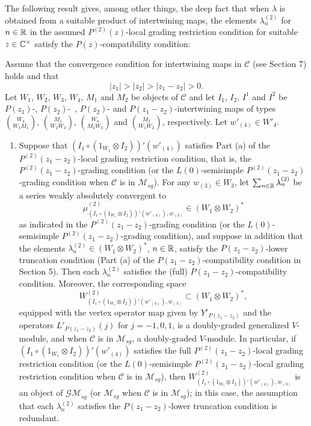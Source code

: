 \documentclass[12pt]{article}
\begin{document}
The following result gives, among other things, the deep fact that
when $\lambda$ is obtained from a suitable product of intertwining
maps, the elements $\lambda^{(2)}_{n}$ for $n\in \mathbb{R}$ in the assumed
$P^{(2)}(z)$-local grading restriction condition for suitable $z\in
\mathbb{C}^{\times}$ satisfy the $P(z)$-compatibility condition:

\setcounter{section}{9}
\setcounter{rema}{16}
\begin{theo}
Assume that the convergence condition for intertwining maps in
$\mathcal{C}$ (see Section 7) holds and that
\[
|z_1|>|z_2|>|z_{1}-z_{2}|>0.
\]
Let $W_{1}$, $W_{2}$, $W_{3}$, $W_{4}$, $M_{1}$ and $M_{2}$ be objects
of $\mathcal{C}$ and let $I_{1}$, $I_{2}$, $I^1$ and $I^2$ be
$P(z_1)$-, $P(z_2)$-~, $P(z_2)$- and $P(z_{1}-z_{2})$-intertwining
maps of types ${W_4}\choose {W_1M_1}$, ${M_1}\choose {W_2W_3}$,
${W_4}\choose {M_2W_3}$ and ${M_2}\choose {W_1W_2}$, respectively.
Let $w'_{(4)}\in W'_4$.
\begin{enumerate}

\item
Suppose that $(I_1\circ (1_{W_1}\otimes I_2))'(w'_{(4)})$ satisfies
Part (a) of the $P^{(2)}(z_{1}-z_{2})$-local grading restriction condition,
that is, the $P^{(2)}(z_{1}-z_{2})$-grading condition (or the
$L(0)$-semisimple $P^{(2)}(z_{1}-z_{2})$-grading condition when $\mathcal{C}$
is in $\mathcal{M}_{sg}$).  For any $w_{(3)}\in W_{3}$, let
$\sum_{n\in \mathbb{R}}\lambda_{n}^{(2)}$ be a series weakly absolutely
convergent to
\[
\mu^{(2)}_{(I_1\circ (1_{W_1}\otimes I_2))'(w'_{(4)}), w_{(3)}} \in
(W_1 \otimes W_2)^*
\]
as indicated in the $P^{(2)}(z_{1}-z_{2})$-grading condition (or the
$L(0)$-semisimple $P^{(2)}(z_{1}-z_{2})$-grading condition), and suppose in
addition that the elements $\lambda_{n}^{(2)} \in (W_{1}\otimes
W_{2})^{*}$, $n\in \mathbb{R}$, satisfy the $P(z_{1}-z_{2})$-lower truncation
condition (Part (a) of the $P(z_{1}-z_{2})$-compatibility condition in
Section 5).  Then each $\lambda_{n}^{(2)}$ satisfies the (full)
$P(z_{1}-z_{2})$-compatibility condition.  Moreover, the corresponding space
\[
W^{(2)}_{(I_1\circ (1_{W_1}\otimes I_2))'(w'_{(4)}), w_{(3)}} \subset
(W_{1}\otimes W_{2})^{*},
\]
equipped with the vertex operator map given by $Y'_{P(z_{1}-z_{2})}$ and the
operators $L'_{P(z_{1}-z_{2})}(j)$ for $j=-1, 0, 1$, is a doubly-graded
generalized $V$-module, and when $\mathcal{C}$ is in
$\mathcal{M}_{sg}$, a doubly-graded $V$-module.  In particular, if
$(I_1\circ (1_{W_1}\otimes I_2))'(w'_{(4)})$ satisfies the full
$P^{(2)}(z_{1}-z_{2})$-local grading restriction condition (or the
$L(0)$-semisimple $P^{(2)}(z_{1}-z_{2})$-local grading restriction condition
when $\mathcal{C}$ is in $\mathcal{M}_{sg}$), then $W^{(2)}_{(I_1\circ
(1_{W_1}\otimes I_2))'(w'_{(4)}), w_{(3)}}$ is an object of
$\mathcal{GM}_{sg}$ (or $\mathcal{M}_{sg}$ when $\mathcal{C}$ is in
$\mathcal{M}_{sg}$); in this case, the assumption that each
$\lambda_{n}^{(2)}$ satisfies the $P(z_{1}-z_{2})$-lower truncation condition
is redundant.


\end{enumerate}
\end{theo}
\end{document}
